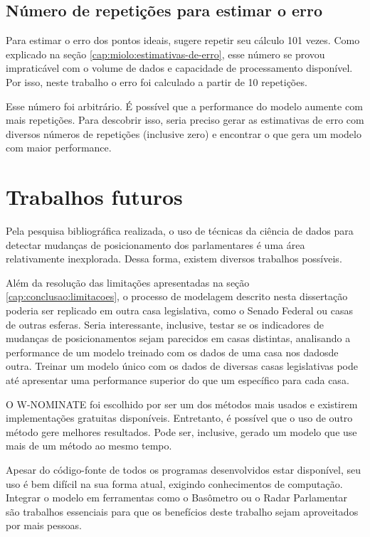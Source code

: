 \documentclass[a4paper,titlepage]{ppgi}\usepackage[]{graphicx}\usepackage[]{color}
\begin{document}
\subsection{Número de repetições para estimar o erro}

Para estimar o erro dos pontos ideais,  sugere repetir
seu cálculo 101 vezes. Como explicado na seção
\ref{cap:miolo:estimativas-de-erro}, esse número se provou impraticável com o
volume de dados e capacidade de processamento disponível. Por isso, neste
trabalho o erro foi calculado a partir de 10 repetições.

Esse número foi arbitrário. É possível que a performance do modelo aumente com
mais repetições. Para descobrir isso, seria preciso gerar as estimativas de
erro com diversos números de repetições (inclusive zero) e encontrar o que gera
um modelo com maior performance.

\section{Trabalhos futuros}

Pela pesquisa bibliográfica realizada, o uso de técnicas da ciência de dados
para detectar mudanças de posicionamento dos parlamentares é uma área
relativamente inexplorada. Dessa forma, existem diversos trabalhos possíveis.

Além da resolução das limitações apresentadas na seção
\ref{cap:conclusao:limitacoes}, o processo de modelagem descrito nesta
dissertação poderia ser replicado em outra casa legislativa, como o Senado
Federal ou casas de outras esferas. Seria interessante, inclusive, testar se os
indicadores de mudanças de posicionamentos sejam parecidos em casas distintas,
analisando a performance de um modelo treinado com os dados de uma casa nos
dadosde outra. Treinar um modelo único com os dados de diversas casas
legislativas pode até apresentar uma performance superior do que um específico
para cada casa.

O W-NOMINATE foi escolhido por ser um dos métodos mais usados e existirem
implementações gratuitas disponíveis. Entretanto, é possível que o uso de outro
método gere melhores resultados. Pode ser, inclusive, gerado um modelo que use
mais de um método ao mesmo tempo.

Apesar do código-fonte de todos os programas desenvolvidos estar disponível, 
seu uso é bem difícil na sua forma atual, exigindo conhecimentos de computação.
Integrar o modelo em ferramentas como o Basômetro ou o Radar Parlamentar são
trabalhos essenciais para que os benefícios deste trabalho sejam aproveitados
por mais pessoas.
\end{document}
